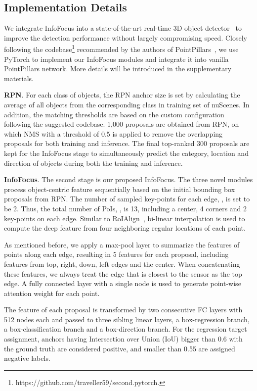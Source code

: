 \documentclass[runningheads]{llncs}
\begin{document}
\subsection{Implementation Details}
We integrate InfoFocus into a state-of-the-art real-time 3D object detector~\cite{lang2019PointPillars} to improve the detection performance without largely compromising speed. Closely following the codebase\footnote{https://github.com/traveller59/second.pytorch.} recommended by the authors of PointPillars~\cite{lang2019PointPillars}, we use PyTorch to implement our InfoFocus modules and integrate it into vanilla PointPillars network. More details will be introduced in the supplementary materials. 

\noindent\textbf{RPN}. For each class of objects, the RPN anchor size is set by calculating the average of all objects from the corresponding class in training set of nuScenes. In addition, the matching thresholds are based on the custom configuration following the suggested codebase. 1,000 proposals are obtained from RPN, on which NMS with a threshold of 0.5 is applied to remove the overlapping proposals for both training and inference. The final top-ranked 300 proposals are kept for the InfoFocus stage to simultaneously predict the category, location and direction of objects during both the training and inference.

\noindent\textbf{InfoFocus}. The second stage is our proposed InfoFocus. The three novel modules process object-centric feature sequentially based on the initial bounding box proposals from RPN. The number of sampled key-points for each edge, , is set to be 2. Thus, the total number of PoIs, , is 13, including a center, 4 corners and 2 key-points on each edge. Similar to RoIAlign~\cite{he2017mask}, bi-linear interpolation is used to compute the deep feature from four neighboring regular locations of each point.

As mentioned before, we apply a max-pool layer to summarize the features of points along each edge, resulting in 5 features for each proposal, including features from top, right, down, left edges and the center. When concatenating these features, we always treat the edge that is closest to the sensor as the top edge. A fully connected layer with a single node is used to generate point-wise attention weight for each point.

The feature of each proposal is transformed by two consecutive FC layers with 512 nodes each and passed to three sibling linear layers, a box-regression branch, a box-classification branch and a box-direction branch. For the regression target assignment, anchors having Intersection over Union (IoU) bigger than 0.6 with the ground truth are considered positive, and smaller than 0.55 are assigned negative labels. 
\end{document}
